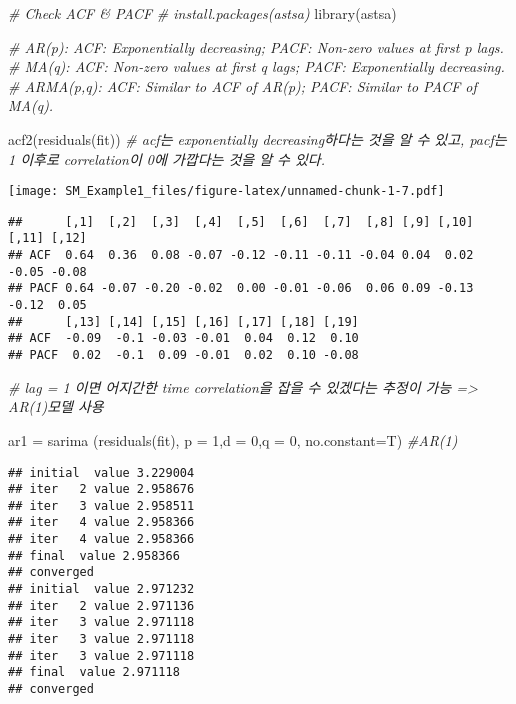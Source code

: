 \documentclass[
]{article}
\newenvironment{Shaded}{\begin{snugshade}}{\end{snugshade}}
\newcommand{\AttributeTok}[1]{\textcolor[rgb]{0.77,0.63,0.00}{#1}}
\newcommand{\CommentTok}[1]{\textcolor[rgb]{0.56,0.35,0.01}{\textit{#1}}}
\newcommand{\DecValTok}[1]{\textcolor[rgb]{0.00,0.00,0.81}{#1}}
\newcommand{\FunctionTok}[1]{\textcolor[rgb]{0.00,0.00,0.00}{#1}}
\newcommand{\NormalTok}[1]{#1}
\newcommand{\OtherTok}[1]{\textcolor[rgb]{0.56,0.35,0.01}{#1}}
\begin{document}
\begin{Shaded}
\begin{Highlighting}[]
\CommentTok{\# Check ACF \& PACF}
\CommentTok{\# install.packages(\textquotesingle{}astsa\textquotesingle{})}
\FunctionTok{library}\NormalTok{(astsa)}

\CommentTok{\# AR(p): ACF: Exponentially decreasing; PACF: Non{-}zero values at first p lags.}
\CommentTok{\# MA(q): ACF: Non{-}zero values at first q lags; PACF: Exponentially decreasing.}
\CommentTok{\# ARMA(p,q): ACF: Similar to ACF of AR(p); PACF: Similar to PACF of MA(q).}

\FunctionTok{acf2}\NormalTok{(}\FunctionTok{residuals}\NormalTok{(fit)) }\CommentTok{\# acf는 exponentially decreasing하다는 것을 알 수 있고, pacf는 1 이후로 correlation이 0에 가깝다는 것을 알 수 있다. }
\end{Highlighting}
\end{Shaded}

\texttt{[image: SM\_Example1\_files/figure-latex/unnamed-chunk-1-7.pdf]}

\begin{verbatim}
##      [,1]  [,2]  [,3]  [,4]  [,5]  [,6]  [,7]  [,8] [,9] [,10] [,11] [,12]
## ACF  0.64  0.36  0.08 -0.07 -0.12 -0.11 -0.11 -0.04 0.04  0.02 -0.05 -0.08
## PACF 0.64 -0.07 -0.20 -0.02  0.00 -0.01 -0.06  0.06 0.09 -0.13 -0.12  0.05
##      [,13] [,14] [,15] [,16] [,17] [,18] [,19]
## ACF  -0.09  -0.1 -0.03 -0.01  0.04  0.12  0.10
## PACF  0.02  -0.1  0.09 -0.01  0.02  0.10 -0.08
\end{verbatim}

\begin{Shaded}
\begin{Highlighting}[]
\CommentTok{\# lag = 1 이면 어지간한 time correlation을 잡을 수 있겠다는 추정이 가능 =\textgreater{} AR(1)모델 사용}

\NormalTok{ar1 }\OtherTok{=} \FunctionTok{sarima}\NormalTok{ (}\FunctionTok{residuals}\NormalTok{(fit), }\AttributeTok{p =} \DecValTok{1}\NormalTok{,}\AttributeTok{d =} \DecValTok{0}\NormalTok{,}\AttributeTok{q =} \DecValTok{0}\NormalTok{, }\AttributeTok{no.constant=}\NormalTok{T)   }\CommentTok{\#AR(1)}
\end{Highlighting}
\end{Shaded}

\begin{verbatim}
## initial  value 3.229004 
## iter   2 value 2.958676
## iter   3 value 2.958511
## iter   4 value 2.958366
## iter   4 value 2.958366
## final  value 2.958366 
## converged
## initial  value 2.971232 
## iter   2 value 2.971136
## iter   3 value 2.971118
## iter   3 value 2.971118
## iter   3 value 2.971118
## final  value 2.971118 
## converged
\end{verbatim}
\end{document}
